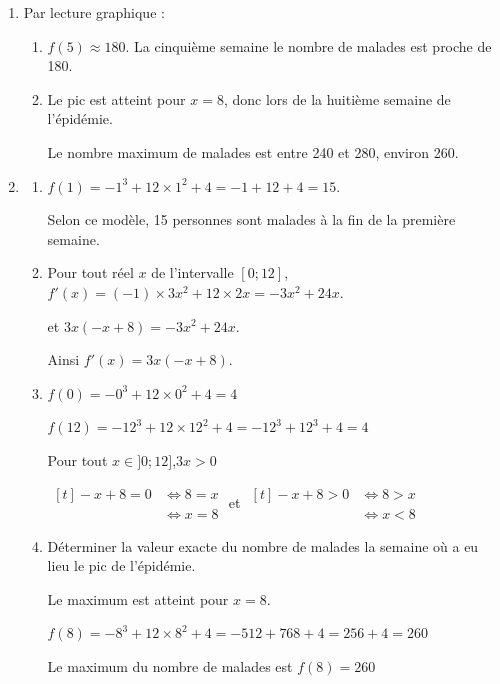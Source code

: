 \begin{enumerate}
\item Par lecture graphique :
	\begin{enumerate}
		\item
		$f(5)\approx 180$. \quad La cinquième semaine le nombre de malades est proche de 180.

		\item
		Le pic est atteint pour $x=8$, donc lors de la huitième semaine de l'épidémie.

		Le nombre maximum de malades est entre 240 et 280, environ 260.
	\end{enumerate}

\item
	\begin{enumerate}
		\item
		 $f(1) = - 1^{3} + 12\times 1^{2} + 4 = -1 + 12 + 4 = 15 $.

		 Selon ce modèle, 15 personnes sont malades à la fin de la première semaine.

		\item Pour tout réel $x$ de l'intervalle $[0 ; 12]$,
		\quad$f'(x)= (-1) \times 3x^2 + 12\times 2x = -3x^2+24x$.

		et \quad$3x (-x+8) = -3 x^2 + 24x$.

		Ainsi $f'(x) = 3x (-x+8)$.

		\item
		$f(0) =-0^3 + 12\times 0^{2} + 4 = 4$

		$f(12) =-12^3 + 12\times 12^{2} + 4 = -12^3 + 12^3 + 4 = 4$

		Pour tout $x\in ]0 ; 12]$,\quad  $ 3x > 0 $

		$\begin{aligned}[t]
			-x+8 = 0 &\iff 8 = x \\
			&\iff x = 8
		\end{aligned}$
		\quad et \quad
		$\begin{aligned}[t]
			-x+8 > 0 &\iff 8 > x \\&\iff x < 8
		\end{aligned}$


		\begin{center}
		\end{center}


		\item Déterminer la valeur exacte du nombre de malades la semaine où a eu lieu le pic de l'épidémie.

		Le maximum est atteint pour $x=8$.

		$f(8) = -8^3 + 12 \times 8^2 + 4 = -512 + 768 + 4 = 256 + 4 = 260$

		Le maximum du nombre de malades est $f(8) = 260$

	\end{enumerate}
\end{enumerate}

